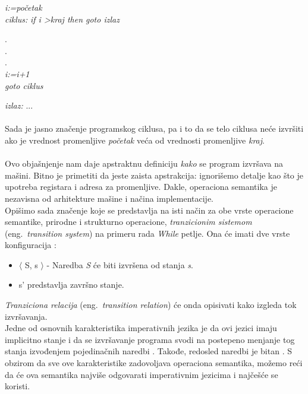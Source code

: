 \documentclass[a4paper]{article}
\begin{document}
{\hspace{4cm} \textit{i:=početak}\\
\textit{ciklus:} \hspace{3cm} \textit{if i \textgreater kraj then goto izlaz}
\begin{center}
.
\\.
\\.
\\ \textit{i:=i+1}
\\ \textit{goto ciklus}
\end{center}
\textit{izlaz:} \hspace{4cm} ...\\
\\Sada je jasno značenje programskog ciklusa, pa i to da se telo ciklusa neće izvršiti ako je vrednost promenljive \textit{početak} veća od vrednosti promenljive \textit{kraj}.\\
\\Ovo objašnjenje nam daje apstraktnu definiciju \textit{kako} se program izvršava na mašini. Bitno je primetiti da jeste zaista apstrakcija: ignorišemo detalje kao što je upotreba registara i adresa za promenljive. Dakle, operaciona semantika je nezavisna od arhitekture mašine i načina implementacije.\\

Opišimo sada značenje koje se predstavlja na isti način za obe vrste operacione semantike, prirodne i strukturno operacione, \textit{tranzicionim sistemom} (eng.~{\em transition system}) na primeru rada \emph{While} petlje. Ona će imati dve vrste konfiguracija \cite{willey}:
\begin{itemize}
	\item $\langle$ S, s $\rangle$ - Naredba \textit{S} će biti izvršena od stanja \textit{s}.
	\item s' predstavlja završno stanje.
\end{itemize}
\textit{Tranziciona relacija} (eng.~{\em transition relation}) će onda opisivati kako izgleda tok izvršavanja. \\

Jedne od osnovnih karakteristika imperativnih jezika je da ovi jezici imaju implicitno stanje i da se izvršavanje programa svodi na postepeno menjanje tog stanja izvođenjem pojedinačnih naredbi \cite{milena2}. Takođe, redosled naredbi je bitan \cite{milena2}. S obzirom da sve ove karakteristike zadovoljava operaciona semantika, možemo reći da će ova semantika najviše odgovarati imperativnim jezicima i najčešće se koristi.  

}
\end{document}

